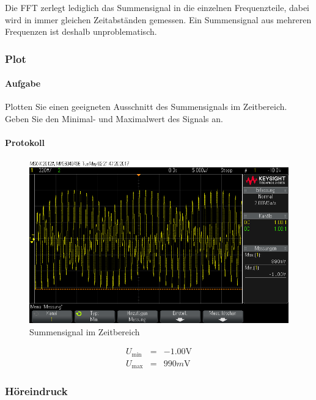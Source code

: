 \documentclass[10pt]{report}
\begin{document}
        Die FFT zerlegt lediglich das Summensignal in die einzelnen Frequenzteile,
        dabei wird in immer gleichen Zeitabständen gemessen. Ein Summensignal aus
        mehreren Frequenzen ist deshalb unproblematisch.

        \subsubsection{Plot}
        \paragraph{Aufgabe}
        Plotten Sie einen geeigneten Ausschnitt des Summensignals im Zeitbereich. Geben
        Sie den Minimal- und Maximalwert des Signals an.
        \paragraph{Protokoll}
        \begin{center}
            \begin{figure}[H]
                \includegraphics[width=\textwidth]{Screenshot_GUI_4202.png}
              \caption{Summensignal im Zeitbereich}
            \end{figure}
        \end{center}

        \begin{eqnarray*}
            U_{\min{}} &=& -1.00\si{\volt}\\
            U_{\max{}} &=& 990\si{m\volt}
        \end{eqnarray*}

        \subsubsection{Höreindruck}
\end{document}
